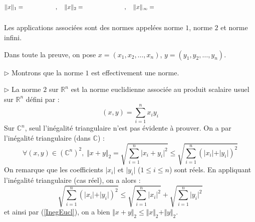 \documentclass[a4paper,10pt]{report}
\begin{document}
$$\Vert x \Vert_1  = \phantom{\sum_{i=1}^n \vert x_i \vert} \qquad, \quad \Vert x \Vert_2  = \phantom{\sqrt{\sum_{i=1}^n \vert x_i \vert^2 }} \qquad, \quad \Vert x \Vert_{\infty}  = \phantom{\sup_{i \in \Interv{1}{n}} \vert x_i \vert = \max_{i \in \Interv{1}{n}} \vert x_i \vert }$$
Les applications associées sont des normes appelées norme $1$, norme $2$ et norme infini.

\medskip

\begin{Demonstration}{} Dans toute la preuve, on pose $x=(x_1, x_2, \ldots, x_n)$, $y=(y_1, y_2, \ldots,y_n)$.

\medskip

$\rhd$ Montrons que la norme $1$ est effectivement une norme. 


\vspace{11cm}
%

$\rhd$ La norme $2$ sur $\mathbb{R}^n$ est la norme euclidienne associée au produit scalaire usuel sur $\mathbb{R}^n$ défini par :
$$ (x,y) = \sum_{i=1}^n x_i y_i $$
Sur $\mathbb{C}^n$, seul l'inégalité triangulaire n'est pas évidente à prouver. On a par l'inégalité triangulaire (dans $\mathbb{C}$) :
\begin{equation}\label{InegEucl} \forall (x,y) \in (\mathbb{C}^n)^2, \; \Vert x+y \Vert_2 =  \sqrt{\sum_{i=1}^n \vert x_i+y_i \vert^2} \leq \sqrt{\sum_{i=1}^n (\vert x_i \vert + \vert y_i \vert)^2}
\end{equation}
On remarque que les coefficients $\vert x_i \vert$ et $\vert y_i \vert$ ($1 \leq i \leq n$) sont réels. En appliquant l'inégalité triangulaire (cas réel), on a alors :
$$ \sqrt{\sum_{i=1}^n (\vert x_i \vert + \vert y_i \vert)^2} \leq \sqrt{\sum_{i=1}^n \vert x_i \vert^2 } + \sqrt{\sum_{i=1}^n \vert y_i \vert^2 }$$
et ainsi par (\ref{InegEucl}), on a bien $\Vert x + y \Vert_2 \leq \Vert x  \Vert_2 + \Vert  y \Vert_2$.


\end{Demonstration}
\end{document}
